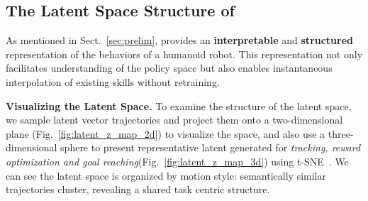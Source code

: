 \subsection{The Latent Space Structure of \method{}}
\label{sec:latent}
\vspace{-2mm}
As mentioned in Sect.~\ref{sec:prelim}, \method{} provides an \textbf{interpretable} and \textbf{structured} representation of the behaviors of a humanoid robot. This representation not only facilitates understanding of the policy space but also enables instantaneous interpolation of existing skills without retraining. 

\textbf{Visualizing the Latent Space.}
 To examine the structure of the latent space, we sample latent vector trajectories and project them onto a two-dimensional plane (Fig.~\ref{fig:latent_z_map_2d}) to visualize the space, and also use a three-dimensional sphere to present representative latent generated for \emph{tracking, reward optimization and goal reaching}(Fig.~\ref{fig:latent_z_map_3d}) using t-SNE~\citep{tsne}. We can see the latent space is organized by motion style: semantically similar trajectories cluster, revealing a shared task centric structure.



